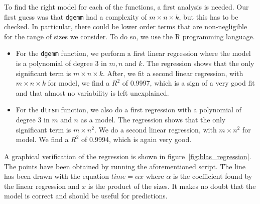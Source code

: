 \documentclass[12pt, a4paper]{memoir}
\begin{document}
To find the right model for each of the functions, a first analysis is needed. Our first guess was that \texttt{dgemm} had a
complexity of \(m \times n \times k\), but this has to be checked. In particular, there could be lower order terms that are
non-negligible for the range of sizes we consider. To do so, we use the R programming language.
\begin{itemize}
\item For the \texttt{dgemm} function, we perform a first linear regression where the model is a polynomial of degree 3 in \(m, n\)
and \(k\). The regression shows that the only significant term is \(m \times n \times k\). After, we fit a second linear
regression, with \(m \times n \times k\) for model, we find a \(R^2\) of 0.9997, which is a sign of a very good fit and that
almost no variability is left unexplained.
\item For the \texttt{dtrsm} function, we also do a first regression with a polynomial of degree 3 in \(m\) and \(n\) as a model. The
regression shows that the only significant term is \(m \times n^2\). We do a second linear regression, with \(m \times n^2\) for
model. We find a \(R^2\) of 0.9994, which is again very good.
\end{itemize}
A graphical verification of the regression is shown in figure~\ref{fig:blas_regression}. The points have been obtained by
running the aforementioned script. The line has been drawn with the equation \(time = \alpha x\) where \(\alpha\) is the
coefficient found by the linear regression and \(x\) is the product of the sizes. It makes no doubt that the model is
correct and should be useful for predictions.
\end{document}
